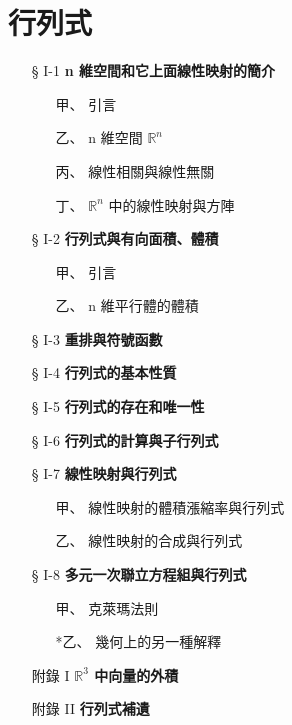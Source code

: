 \section{行列式}\label{sec:b6s-ch1}

\begin{center}
\begin{minipage}{0.75\textwidth}
\begin{itemize}[leftmargin=2em, itemsep=0.3em]
  \item[§ I-1] \textbf{n 維空間和它上面線性映射的簡介}
  \begin{itemize}[leftmargin=2em, itemsep=0.2em]
    \item[甲、] 引言
    \item[乙、] n 維空間 $\mathbb{R}^n$
    \item[丙、] 線性相關與線性無關
    \item[丁、] $\mathbb{R}^n$ 中的線性映射與方陣
  \end{itemize}
  \item[§ I-2] \textbf{行列式與有向面積、體積}
  \begin{itemize}[leftmargin=2em, itemsep=0.2em]
    \item[甲、] 引言
    \item[乙、] n 維平行體的體積
  \end{itemize}
  \item[§ I-3] \textbf{重排與符號函數}
  \item[§ I-4] \textbf{行列式的基本性質}
  \item[§ I-5] \textbf{行列式的存在和唯一性}
  \item[§ I-6] \textbf{行列式的計算與子行列式}
  \item[§ I-7] \textbf{線性映射與行列式}
  \begin{itemize}[leftmargin=2em, itemsep=0.2em]
    \item[甲、] 線性映射的體積漲縮率與行列式
    \item[乙、] 線性映射的合成與行列式
  \end{itemize}
  \item[§ I-8] \textbf{多元一次聯立方程組與行列式}
  \begin{itemize}[leftmargin=2em, itemsep=0.2em]
    \item[甲、] 克萊瑪法則
    \item[*乙、] 幾何上的另一種解釋
  \end{itemize}
  \item[附錄 I] \textbf{$\mathbb{R}^3$ 中向量的外積}
  \item[附錄 II] \textbf{行列式補遺}
\end{itemize}
\end{minipage}
\end{center}

